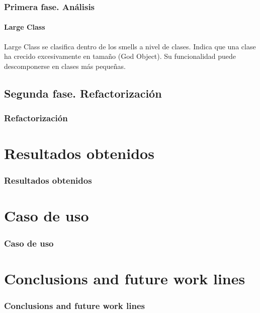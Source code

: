 \documentclass{beamer}
\begin{document}
\begin{frame}
  \frametitle{Primera fase. Análisis}
  \framesubtitle{Large Class}
    Large Class se clasifica dentro de los smells a nivel de clases. Indica que una clase ha crecido excesivamente en tamaño
    (God Object). Su funcionalidad puede descomponerse en clases más pequeñas.
\end{frame}


\subsection{Segunda fase. Refactorización}
\begin{frame}
\frametitle{Refactorización}


\end{frame}




\section{Resultados obtenidos}

\begin{frame}[allowframebreaks]
\frametitle{Resultados obtenidos}


\end{frame}

  
\section{Caso de uso}

\begin{frame}[allowframebreaks]
\frametitle{Caso de uso}

\end{frame}


\section{Conclusions and future work lines}
\begin{frame}[allowframebreaks]
  \frametitle{Conclusions and future work lines}

\end{frame}
\end{document}
